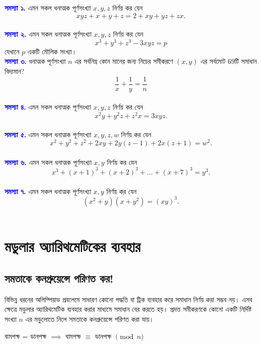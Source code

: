 \documentclass[11pt]{report}
\begin{document}
\begin{flushleft}

\textbf{\textcolor{blue}{সমস্যা ১.}} এমন সকল ধনাত্মক পূর্ণসংখ্যা $x, y, z$ নির্ণয় কর যেন $$xyz+x+y+z=2+xy+yz+zx.$$\\

\textbf{\textcolor{blue}{সমস্যা ২.}} এমন সকল ধনাত্মক পূর্ণসংখ্যা $x, y, z$ নির্ণয় কর যেন $$x^3+y^3+z^3-3xyz=p$$ যেখানে $p$ একটি মৌলিক সংখ্যা।\\

\textbf{\textcolor{blue}{সমস্যা ৩.}} ধনাত্মক পূর্ণসংখ্যা $n$ এর সর্বনিম্ন কোন মানের জন্য নিচের সমীকরণে $(x,y)$ এর সর্বমোট $69$টি সমাধান বিদ্যমান? $$\frac{1}{x}+\frac{1}{y}=\frac{1}{n}$$\\

\textbf{\textcolor{blue}{সমস্যা ৪.}} এমন সকল ধনাত্মক পূর্ণসংখ্যা $x, y, z$ নির্ণয় কর যেন $$x^2y+y^2z+z^2x=3xyz.$$\\

\textbf{\textcolor{blue}{সমস্যা ৫.}} এমন সকল ধনাত্মক পূর্ণসংখ্যা $x, y, z, w$ নির্ণয় কর যেন $$x^2+y^2+z^2+2xy+2y(z-1)+2x(z+1)=w^2.$$\\

\textbf{\textcolor{blue}{সমস্যা ৬.}} এমন সকল ধনাত্মক পূর্ণসংখ্যা $x, y$ নির্ণয় কর যেন $$x^3+(x+1)^3+(x+2)^3+\ldots+(x+7)^3=y^3.$$\\

\textbf{\textcolor{blue}{সমস্যা ৭.}} এমন সকল ধনাত্মক পূর্ণসংখ্যা $x, y$ নির্ণয় কর যেন $$(x^2+y)(x+y^2)=(xy)^3.$$\\

\end{flushleft}

\chapter{মডুলার অ্যারিথমেটিকের ব্যবহার}

\section{সমতাকে কনগ্রুয়েন্সে পরিণত কর!}

বিভিন্ন ধরনের অলিম্পিয়াড প্রবলেমে সাধারণ কোনো পদ্ধতি বা ট্রিক ব্যবহার করে সমাধান নির্ণয় করা সম্ভব নয়। এসব ক্ষেত্রে মডুলার অ্যারিথমেটিক ব্যবহার করার মাধ্যমে সমাধান বের করতে হয়। প্রদত্ত সমীকরণকে কোনো একটি নির্দিষ্ট সংখ্যা $n$ এর মডুলোতে নিলে সমতাকে কনগ্রুয়েন্সে পরিণত করা যায়।\\

\begin{tcolorbox}[colframe=blue!80!blue]
\begin{center}
    বামপক্ষ = ডানপক্ষ $\implies$ বামপক্ষ $\equiv$ ডানপক্ষ $\pmod{n}$
\end{center} 
\end{tcolorbox}
\end{document}
